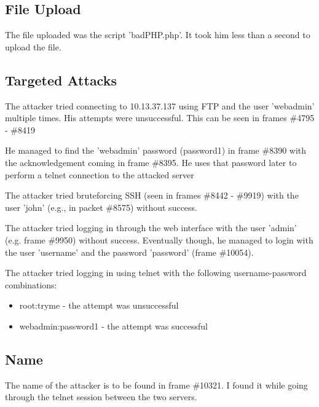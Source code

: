\subsection{File Upload}
The file uploaded was the script 'badPHP.php'.
It took him less than a second to upload the file.

\subsection{Targeted Attacks}
The attacker tried connecting to 10.13.37.137 using FTP and the user 'webadmin' multiple times.
His attempts were unsuccessful.
This can be seen in frames \#4795 - \#8419

He managed to find the 'webadmin' password (password1) in frame \#8390 with the acknowledgement coming in frame \#8395.
He uses that password later to perform a telnet connection to the attacked server

The attacker tried bruteforcing SSH (seen in frames \#8442 - \#9919)
with the user 'john' (e.g., in packet \#8575) without success.

The attacker tried logging in through the web interface with the user 'admin'
(e.g. frame \#9950) without success. Eventually though, he managed to login with the
user 'username' and the password 'password' (frame \#10054).

The attacker tried logging in using telnet with the following username-password combinations:
\begin{itemize}
    \item root:tryme - the attempt was unsuccessful
    \item webadmin:password1 - the attempt was successful
\end{itemize}

\subsection{Name}
The name of the attacker is to be found in frame \#10321.
I found it while going through the telnet session between the two servers.
